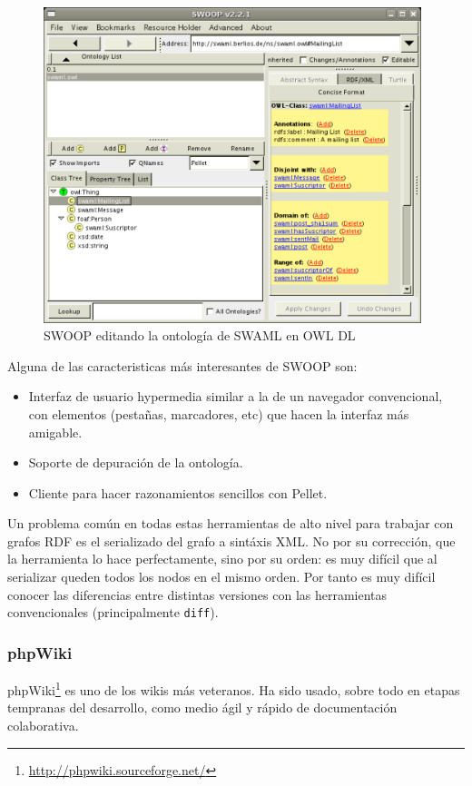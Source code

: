 \begin{figure}[ht]
	\centering
	\includegraphics[width=11cm]{images/screenshots/swoop.png}
	\caption{SWOOP editando la ontología de SWAML en OWL DL}
	\label{fig:evoWeb}
\end{figure}

Alguna de las caracteristicas más interesantes de SWOOP son:

\begin{itemize}
  \item Interfaz de usuario hypermedia similar a la de un navegador convencional, 
	con elementos (pestañas, marcadores, etc) que hacen la interfaz más 
	amigable.
  \item Soporte de depuración de la ontología.
  \item Cliente para hacer razonamientos sencillos con Pellet.
\end{itemize}

Un problema común en todas estas herramientas de alto nivel para trabajar con
grafos RDF es el serializado del grafo a sintáxis XML. No por su corrección,
que la herramienta lo hace perfectamente, sino por su orden: es muy difícil
que al serializar queden todos los nodos en el mismo orden. Por tanto es muy
difícil conocer las diferencias entre distintas versiones con las herramientas
convencionales (principalmente \texttt{diff}).

\subsubsection{phpWiki}

phpWiki\footnote{\url{http://phpwiki.sourceforge.net/}} es uno de los wikis
más veteranos. Ha sido usado, sobre todo en etapas tempranas del desarrollo, 
como medio ágil y rápido de documentación colaborativa.

